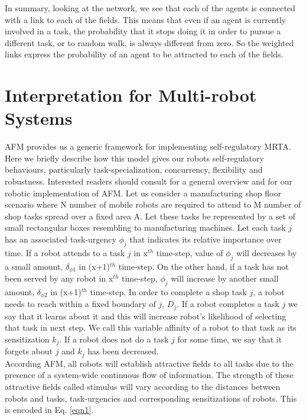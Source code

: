 In summary, looking at the network, we see that each of the agents is connected with a link to each of the fields. This means that even if an agent is currently involved in a task, the probability that it stops doing it in order to pursue a different task, or to random walk, is always different from zero. So the weighted links express the probability of an agent to be attracted to each of the fields.\\
\section{Interpretation for Multi-robot Systems}
AFM provides us a generic framework for implementing self-regulatory MRTA. Here we briefly describe how this model gives our robots self-regulatory behaviours, particularly task-specialization, concurrency, flexibility and robustness. Interested readers should consult \cite{Elsa} for a general overview and \cite{Sarker} for our robotic implementation of AFM.
Let us consider a manufacturing shop floor scenario where N number of mobile robots are required to attend to M number of shop tasks spread over a fixed area A. Let these tasks be represented by a set of small rectangular boxes resembling to manufacturing machines. Let each task $j$ has an associated task-urgency $\phi_j$ that indicates its relative importance over time. If a robot attends to a task $j$ in x$^{th}$ time-step, value of $\phi_j$ will decreases by a small amount, $\delta_{\phi 1}$ in (x+1)$^{th}$ time-step. On the other hand, if a task has not been served by any robot in x$^{th}$ time-step, $\phi_j$ will increase by another small amount, $\delta_{\phi 2}$ in (x+1)$^{th}$ time-step. In order to complete a shop task $j$, a robot needs to reach within a fixed boundary of $j$, $D_j$. If a robot completes a task $j$ we say that it learns about it and this will increase robot's likelihood of selecting that task in next step. We call this variable affinity of a robot to that task as its sensitization $k_j$. If a robot does not do a task $j$ for some time, we say that it forgets about $j$ and $k_j$ has been decreased.\\
According AFM, all robots will establish attractive fields to all tasks due to the presence of a system-wide continuous flow of information. The strength of these attractive fields called stimulus will vary according to the distances between robots and tasks, task-urgencies and corresponding sensitizations of robots. This is encoded in Eq. \ref{eqn1}.
